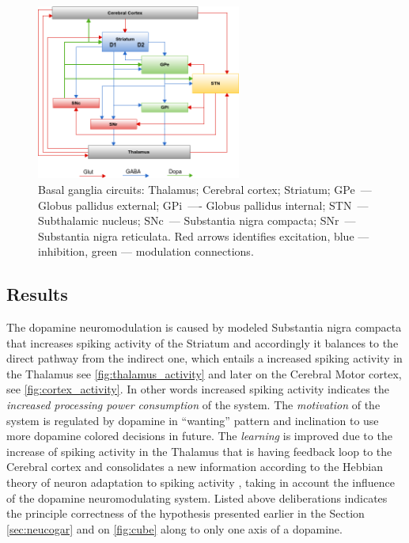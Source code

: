 \documentclass[procedia]{easychair}
\begin{document}
\begin{figure}
\center\includegraphics[width=0.6\textwidth]{dopamine_pathway}
\caption{Basal ganglia circuits: Thalamus; Cerebral cortex; Striatum; GPe\ ---
Globus pallidus external; GPi\ ---- Globus pallidus internal; STN\ --- Subthalamic nucleus; SNc\ --- Substantia
nigra compacta; SNr\ --- Substantia nigra reticulata.
Red arrows identifies excitation, blue --- inhibition, green --- modulation connections.}
\label{fig:BG_advanced}
\end{figure}

\subsection{Results}

The dopamine neuromodulation is caused by modeled Substantia nigra compacta that increases spiking activity of the Striatum and
accordingly it balances to the direct pathway from the indirect one, which entails
a increased spiking activity in the Thalamus see \autoref{fig:thalamus_activity}
and later on the Cerebral Motor cortex, see \autoref{fig:cortex_activity}.
In other words increased spiking activity indicates the \textit{increased processing power consumption} of the system.
The \textit{motivation} of the system is regulated by dopamine in ``wanting'' pattern and inclination to use more dopamine
colored decisions in future.
The \textit{learning} is improved due to the increase of spiking activity in the Thalamus that is having feedback loop to
the Cerebral cortex and consolidates a new information according to the Hebbian theory of neuron adaptation to spiking
activity \cite{hebb1949}, taking in account the influence of the dopamine neuromodulating system.
Listed above deliberations indicates the principle correctness of the hypothesis presented earlier in the Section \ref{sec:neucogar} and on \autoref{fig:cube} along to only one axis of a dopamine.
\end{document}
